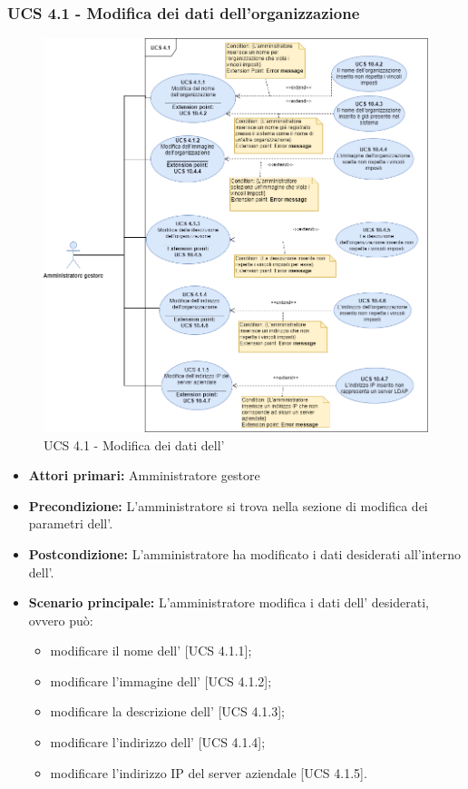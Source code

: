 \subsubsection{UCS 4.1 - Modifica dei dati dell'organizzazione}%
\begin{figure}[h]
	\centering
    \includegraphics[scale=0.53]{Sezioni/UseCase/Immagini/UCS4.1.png}
    \caption{UCS 4.1 - Modifica dei dati dell'}
\end{figure}
\begin{itemize}
    \item \textbf{Attori primari:} Amministratore gestore
    \item \textbf{Precondizione:} L'amministratore si trova nella sezione di modifica dei parametri dell'.
    \item \textbf{Postcondizione:} L'amministratore ha modificato i dati desiderati all'interno dell'.
    \item \textbf{Scenario principale:} L'amministratore modifica i dati dell' desiderati, ovvero può:
    \begin{itemize}
        \item modificare il nome dell' [UCS 4.1.1];
        \item modificare l'immagine dell' [UCS 4.1.2];
        \item modificare la descrizione dell' [UCS 4.1.3];
        \item modificare l'indirizzo dell' [UCS 4.1.4];
        \item modificare l'indirizzo IP del server aziendale [UCS 4.1.5].
    \end{itemize}
\end{itemize}

